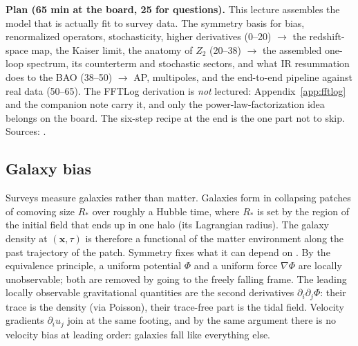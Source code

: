 \documentclass[a4paper,11pt]{article}
\newcommand{\vx}{\bm{x}}
\numberwithin{equation}{section}
\begin{document}
\noindent\textbf{Plan (65 min at the board, 25 for questions).} This lecture assembles the model that is actually fit to survey data. The symmetry basis for bias, renormalized operators, stochasticity, higher derivatives (0--20) $\rightarrow$ the redshift-space map, the Kaiser limit, the anatomy of $Z_2$ (20--38) $\rightarrow$ the assembled one-loop spectrum, its counterterm and stochastic sectors, and what IR resummation does to the BAO (38--50) $\rightarrow$ AP, multipoles, and the end-to-end pipeline against real data (50--65). The FFTLog derivation is \emph{not} lectured: Appendix~\ref{app:fftlog} and the companion note \cite{Nguyen2025} carry it, and only the power-law-factorization idea belongs on the board. The six-step recipe at the end is the one part not to skip. Sources: \cite{Desjacques2018,Kaiser1987,ClassPT2020,ChudaykinIvanov2019,IvanovSibiryakov2018,Simonovic2017}.

\subsection{Galaxy bias}
\label{sec:bias}

Surveys measure galaxies rather than matter. Galaxies form in collapsing patches of comoving size $R_*$ over roughly a Hubble time, where $R_*$ is set by the region of the initial field that ends up in one halo (its Lagrangian radius). The galaxy density at $(\vx,\tau)$ is therefore a functional of the matter environment along the past trajectory of the patch. Symmetry fixes what it can depend on \cite[\S 2]{Desjacques2018}. By the equivalence principle, a uniform potential $\Phi$ and a uniform force $\nabla\Phi$ are locally unobservable; both are removed by going to the freely falling frame. The leading locally observable gravitational quantities are the second derivatives $\partial_i\partial_j\Phi$: their trace is the density (via Poisson), their trace-free part is the tidal field. Velocity gradients $\partial_iu_j$ join at the same footing, and by the same argument there is no velocity bias at leading order: galaxies fall like everything else.
\end{document}
